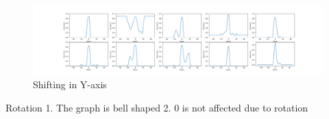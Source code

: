 \begin{figure}
    \centering
        \includegraphics[width=\textwidth]{chapters/results/CNN/ShiftY/accAll.png}
        \caption{Shifting in Y-axis}
        \label{fig:Rotate-misclass0}
\end{figure}
Rotation
1.  The graph is bell shaped
2. 0 is not affected due to rotation